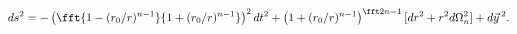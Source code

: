 \begin{equation}
ds^2=-\left(\fft{1-(r_0/r)^{n-1}}{1+(r_0/r)^{n-1}}\right)^2dt^2
+ \left(1+(r_0/r)^{n-1}\right)^{\fft2{n-1}}[dr^2+r^2d\Omega_n^2]+d\vec
y\,^2.
\label{eq:isosch}
\end{equation}

